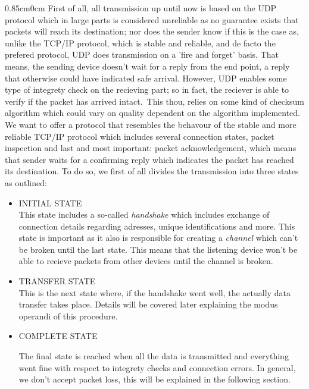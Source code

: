 \documentclass{article}
\newcommand{\tWidth}{0.85cm}
\newcommand{\iPar}[1]{\begin{adjustwidth}{\tWidth}{0cm} #1 \end{adjustwidth}
}
\begin{document}
	\iPar{
		First of all, all transmission up until now is based on the UDP protocol which in large parts is considered unreliable as no guarantee exists that packets will reach its destination; nor does the sender know if this is the case as, unlike the TCP/IP protocol, which is stable and reliable, and de facto the prefered protocol, UDP does transmission on a 'fire and forget' basis. That means, the sending device doesn't wait for a reply from the end point, a reply that otherwise could have indicated safe arrival. However, UDP enables some type of integrety check on the recieving part; so in fact, the reciever is able to verify if the packet has arrived intact.\ This thou, relies on some kind of checksum algorithm which could vary on quality dependent on the algorithm implemented.\\
		
		We want to offer a protocol that resembles the behavour of the stable and more reliable TCP/IP protocol which includes several connection states, packet inspection and last and most important: packet acknowledgement, which means that sender waits for a confirming reply which indicates the packet has reached its destination. To do so, we first of all divides the transmission into three states as outlined:
		
		\begin{itemize}
			\item INITIAL STATE\\
			This state includes a so-called \textit{handshake} which includes exchange of connection details regarding adresses, unique identifications and more. This state is important as it also is responsible for creating a \textit{channel} which can't be broken until the last state. This means that the listening device won't be able to recieve packets from other devices until the channel is broken.
			
			\item TRANSFER STATE\\
			This is the next state where, if the handshake went well, the actually data transfer takes place. Details will be covered later explaining the modus operandi of this procedure.
			
			\item COMPLETE STATE
			
			The final state is reached when all the data is transmitted and everything went fine with respect to integrety checks and connection errors. In general, we don't accept packet loss, this will be explained in the following section. 
		\end{itemize}
		
}
\end{document}
